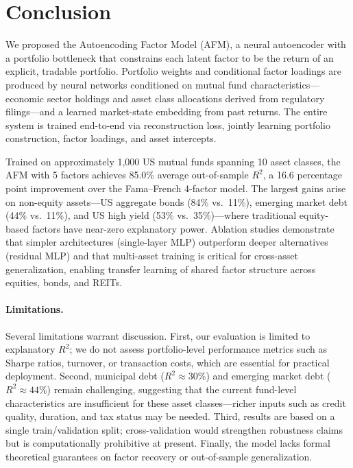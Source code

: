 
\section{Conclusion}\label{sec:conclusion}

We proposed the Autoencoding Factor Model (AFM), a neural autoencoder with a portfolio bottleneck that constrains each latent factor to be the return of an explicit, tradable portfolio. Portfolio weights and conditional factor loadings are produced by neural networks conditioned on mutual fund characteristics---economic sector holdings and asset class allocations derived from regulatory filings---and a learned market-state embedding from past returns. The entire system is trained end-to-end via reconstruction loss, jointly learning portfolio construction, factor loadings, and asset intercepts.

Trained on approximately 1,000 US mutual funds spanning 10 asset classes, the AFM with 5 factors achieves 85.0\% average out-of-sample $R^2$, a 16.6 percentage point improvement over the Fama--French 4-factor model. The largest gains arise on non-equity assets---US aggregate bonds (84\% vs.\ 11\%), emerging market debt (44\% vs.\ 11\%), and US high yield (53\% vs.\ 35\%)---where traditional equity-based factors have near-zero explanatory power. Ablation studies demonstrate that simpler architectures (single-layer MLP) outperform deeper alternatives (residual MLP) and that multi-asset training is critical for cross-asset generalization, enabling transfer learning of shared factor structure across equities, bonds, and REITs.

\paragraph{Limitations.} Several limitations warrant discussion. First, our evaluation is limited to explanatory $R^2$; we do not assess portfolio-level performance metrics such as Sharpe ratios, turnover, or transaction costs, which are essential for practical deployment. Second, municipal debt ($R^2 \approx 30\%$) and emerging market debt ($R^2 \approx 44\%$) remain challenging, suggesting that the current fund-level characteristics are insufficient for these asset classes---richer inputs such as credit quality, duration, and tax status may be needed. Third, results are based on a single train/validation split; cross-validation would strengthen robustness claims but is computationally prohibitive at present. Finally, the model lacks formal theoretical guarantees on factor recovery or out-of-sample generalization.

